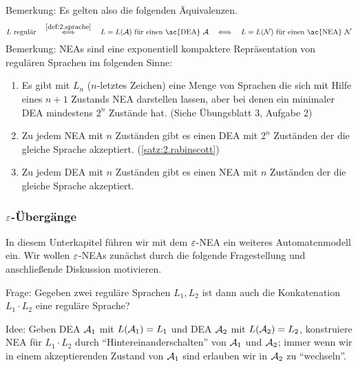 Bemerkung: Es gelten also die folgenden Äquivalenzen.
$$ L \text{ regulär} 
\quad \stackrel{\autoref{def:2.sprache}}{\Longleftrightarrow} \quad L = L(\A) \text{ für einen \ac{DEA} }\A
\quad \Longleftrightarrow \quad L = L(\calN) \text{ für einen \ac{NEA} }\calN
$$
Bemerkung: \ac{NEA}s sind eine exponentiell kompaktere Repräsentation von regulären Sprachen im folgenden Sinne:
\begin{enumerate}
 \item Es gibt mit $L_n$ ($n$-letztes Zeichen) eine Menge von Sprachen die sich mit Hilfe eines $n+1$ Zustands \ac{NEA} darstellen lassen, aber bei denen ein minimaler \ac{DEA} mindestens $2^n$ Zustände hat. (Siehe Übungsblatt 3, Aufgabe 2)
 \item Zu jedem \ac{NEA} mit $n$ Zuständen gibt es einen \ac{DEA} mit $2^n$ Zuständen der die gleiche Sprache akzeptiert. (\autoref{satz:2.rabinscott})
 \item Zu jedem \ac{DEA} mit $n$ Zuständen gibt es einen \ac{NEA} mit $n$ Zuständen der die gleiche Sprache akzeptiert.
\end{enumerate}

\subsubsection{$\varepsilon$-Übergänge}\label{sec:2.EpsNea}
In diesem Unterkapitel führen wir mit dem $\varepsilon$-NEA ein weiteres Automatenmodell ein. 
Wir wollen $\varepsilon$-NEAs zunächst durch die folgende Fragestellung und anschließende Diskussion motivieren.

Frage: Gegeben zwei reguläre Sprachen $L_1, L_2$ ist dann auch die Konkatenation $L_1\cdot L_2$ eine reguläre Sprache?

Idee: Geben DEA $\mathcal{A}_1$ mit $L(\mathcal{A}_1)=L_1$ und DEA $\mathcal{A}_2$ mit $L(\mathcal{A}_2)=L_2$,
konstruiere NEA für $L_1\cdot L_2$ durch "`Hintereinanderschalten"' von $\mathcal{A}_1$ und $\mathcal{A}_2$;
immer wenn wir in einem akzeptierenden Zustand von $\mathcal{A}_1$ sind erlauben wir in $\mathcal{A}_2$ zu "`wechseln"'.


